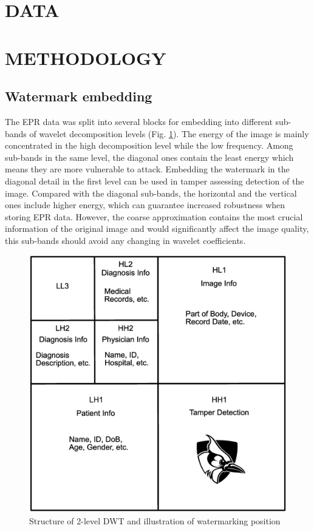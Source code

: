 \documentclass[letterpaper, 10 pt, conference]{ieeeconf}  %
\begin{document}
\section{DATA}


\section{METHODOLOGY}
\subsection{Watermark embedding}
The EPR data was split into several blocks for embedding into different sub-bands of wavelet decomposition levels  (Fig. \ref{WMPos}). The energy of the image is mainly concentrated in the high decomposition level while the low frequency. Among sub-bands in the same level, the diagonal ones contain the least energy which means they are more vulnerable to attack. Embedding the watermark in the diagonal detail in the first level can be used in tamper assessing detection of the image. Compared with the diagonal sub-bands, the horizontal and the vertical ones include higher energy, which can guarantee increased robustness when storing EPR data. However, the coarse approximation contains the most crucial information of the original image and would significantly affect the image quality, this sub-bands should avoid any changing in wavelet coefficients.
\begin{figure}[htbp]
	\centering
	\includegraphics[width=1\linewidth]{WMPos}
	\caption{Structure of 2-level DWT and illustration of watermarking position}
	\label{WMPos}
\end{figure}
\\
\end{document}

